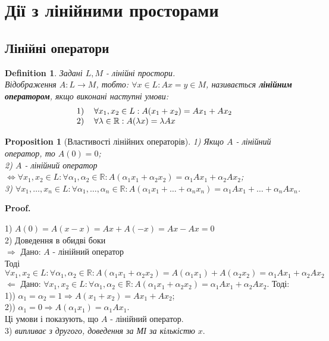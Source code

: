 \documentclass[a4paper, 10pt]{article}
\makeatletter
\def\qed{$\blacksquare$}
\def\rightproof{$\boxed{\Rightarrow}$ }
\def\leftproof{$\boxed{\Leftarrow}$ }
\theoremstyle{theoremdd}
\theoremstyle{theoremdd}
\newtheorem{definition}[theorem]{Definition}
\theoremstyle{theoremdd}
\theoremstyle{theoremdd}
\theoremstyle{theoremdd}
\newtheorem{proposition}[theorem]{Proposition}
\theoremstyle{theoremdd}
\theoremstyle{theoremdd}
\theoremstyle{theoremdd}
\renewenvironment{proof}[1][Proof.\\]{\par
\pushQED{\hfill \qed}%
\normalfont \topsep6\p@\@plus6\p@\relax
\trivlist
\item\relax
{\bfseries
#1\@addpunct{.}}\hspace\labelsep\ignorespaces
}{%
\popQED\endtrivlist\@endpefalse
}
\makeatother
\begin{document}
	
	\section{Дії з лінійними просторами}
	\subsection{Лінійні оператори}
	\begin{definition}
	Задані $L,M$ - лінійні простори.\\
	Відображення $A: L \to M$, тобто: $\forall x \in L: Ax=y \in M$, називається \textbf{лінійним оператором}, якщо виконані наступні умови:
	\begin{align*}
	\begin{tabular}{cl}
	1) & $\forall x_1,x_2 \in L: A(x_1+x_2)=Ax_1+Ax_2$\\
	2) & $\forall \lambda \in \mathbb{R}: A(\lambda x) = \lambda Ax$
	\end{tabular}
	\end{align*}
	\end{definition}
	
	\begin{proposition}[Властивості лінійних операторів]
	1) Якщо $A$ - лінійний оператор, то $A(0) = 0$;\\
	2) $A$ - лінійний оператор $\iff \forall x_1,x_2 \in L: \forall \alpha_1, \alpha_2 \in \mathbb{R}: A(\alpha_1 x_1 + \alpha_2 x_2) = \alpha_1 Ax_1 + \alpha_2 Ax_2$;\\
	3) $\forall x_1,\dots, x_n \in L: \forall \alpha_1, \dots, \alpha_n \in \mathbb{R}: A(\alpha_1 x_1 + \dots + \alpha_n x_n) = \alpha_1 Ax_1 + \dots + \alpha_n Ax_n$.
	\end{proposition}
	
	\begin{proof}
	1) $A(0) = A(x - x) = Ax + A(-x) = Ax - Ax = 0$ \bigskip \\
	2) Доведення в обидві боки\\
	\rightproof Дано: $A$ - лінійний оператор\\
	Тоді $\forall x_1,x_2 \in L: \forall \alpha_1, \alpha_2 \in \mathbb{R}: A(\alpha_1 x_1 + \alpha_2 x_2) = A(\alpha_1 x_1) + A(\alpha_2 x_2) = \alpha_1 Ax_1 + \alpha_2 Ax_2$
	\bigskip \\
	\leftproof Дано: $\forall x_1,x_2 \in L: \forall \alpha_1, \alpha_2 \in \mathbb{R}: A(\alpha_1 x_1 + \alpha_2 x_2) = \alpha_1 Ax_1 + \alpha_2 Ax_2$. Тоді:\\
	1)) $\alpha_1 = \alpha_2 = 1 \Rightarrow A(x_1 + x_2) = Ax_1 + Ax_2$;\\
	2)) $\alpha_1 = 0 \Rightarrow A(\alpha_1 x_1) = \alpha_1 Ax_1$.\\
	Ці умови і показують, що $A$ - лінійний оператор. \bigskip \\
	3) \textit{випливає з другого, доведення за МІ за кількістю} $x$.
	\end{proof}
	
\end{document}
